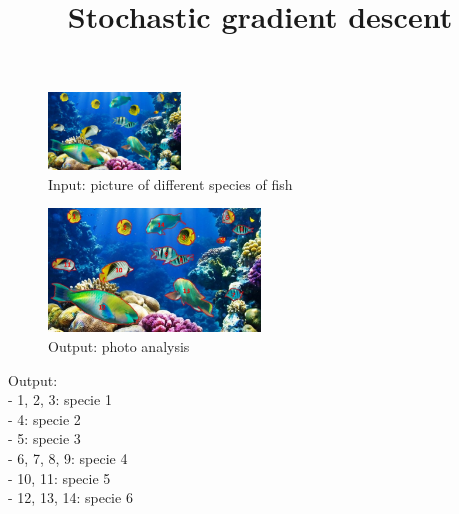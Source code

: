 \documentclass{beamer}
\begin{document}
	\title{Stochastic gradient descent}
	\date{}
	\maketitle

	\newpage
	
	\begin{figure}
	\centering
			\includegraphics[width=100pt]{pictures/fish.jpg}
		\caption{Input: picture of different species of fish}
	\end{figure}
	
		\begin{figure}
	\centering
			\includegraphics[width=160pt]{pictures/fishAll.jpg}
		\caption{Output: photo analysis}
	\end{figure}
	
	\raggedright\hspace{0.7cm}Output:\\
	\hspace{0.6cm}- 1, 2, 3: specie 1\\
	\hspace{0.6cm}- 4: specie 2\\
	\hspace{0.6cm}- 5: specie 3\\
	\hspace{0.6cm}- 6, 7, 8, 9: specie 4\\
	\hspace{0.6cm}- 10, 11: specie 5\\
	\hspace{0.6cm}- 12, 13, 14: specie 6
					
	\newpage
	
\end{document}
